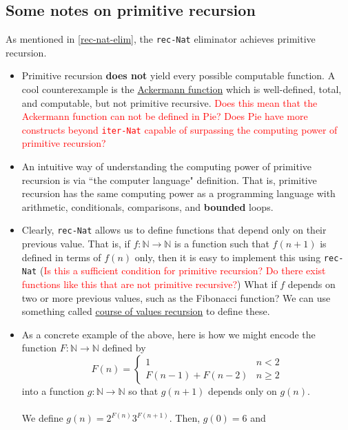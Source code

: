 \documentclass{article}
\newcommand{\ttt}[1]{\texttt{#1}}
\newcommand{\bb}[1]{\mathbb{#1}}
\newcommand{\bN}{\bb{N}}
\begin{document}
\subsection{Some notes on primitive recursion}
As mentioned in \autoref{rec-nat-elim}, the \ttt{rec-Nat} eliminator achieves primitive recursion.
\begin{itemize}
    \item 
        Primitive recursion \textbf{does not} yield every possible computable function. A cool counterexample is the \href{https://en.wikipedia.org/wiki/Ackermann_function}{Ackermann function} which is well-defined, total, and computable, but not primitive recursive. \textcolor{red}{Does this mean that the Ackermann function can not be defined in Pie? Does Pie have more constructs beyond \ttt{iter-Nat} capable of surpassing the computing power of primitive recursion?}
    \item
        An intuitive way of understanding the computing power of primitive recursion is via ``the computer language" definition. That is, primitive recursion has the same computing power as a programming language with arithmetic, conditionals, comparisons, and \textbf{bounded} loops.
    \item
        Clearly, \ttt{rec-Nat} allows us to define functions that depend only on their previous value. That is, if \(f : \mathbb{N} \to \mathbb{N}\) is a function such that \(f(n + 1)\) is defined in terms of \(f(n)\) only, then it is easy to implement this using \ttt{rec-Nat} (\textcolor{red}{Is this a sufficient condition for primitive recursion? Do there exist functions like this that are not primitive recursive?}) What if \(f\) depends on two or more previous values, such as the Fibonacci function? We can use something called \href{https://en.wikipedia.org/wiki/Course-of-values_recursion}{course of values recursion} to define these.
    \item
        As a concrete example of the above, here is how we might encode the function \(F : \bN \to \bN\) defined by \[
            F(n) = \begin{cases}
                        1 & n < 2 \\
                        F(n - 1) + F(n - 2) & n \geq 2
                   \end{cases}
        \]
        into a function \(g : \bN \to \bN\) so that \(g(n + 1)\) depends only on \(g(n)\). 
        \\ \\
        We define \(g(n) = 2^{F(n)}3^{F(n + 1)}\). Then, \(g(0) = 6\) and \begin{align*}

\end{align*}
\end{itemize}
\end{document}
